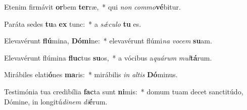\item Etenim firmávit \textbf{or}bem \textbf{ter}ræ,~* qui \textit{non} \textit{com}\textit{mo}\textbf{vé}bitur.
\item Paráta sedes \textbf{tu}a \textbf{ex} tunc:~* a \textit{sǽ}\textit{cu}\textit{lo} \textbf{tu} es.
\item Elevavérunt \textbf{flú}mina, \textbf{Dó}\textbf{mi}ne:~* elevavérunt flúmi\textit{na} \textit{vo}\textit{cem} \textbf{su}am.
\item Elevavérunt flúmina \textbf{fluc}tus \textbf{su}os,~* a vócibus a\textit{quá}\textit{rum} \textit{mul}\textbf{tá}rum.
\item Mirábiles elati\textbf{ó}nes \textbf{ma}ris:~* mirábilis \textit{in} \textit{al}\textit{tis} \textbf{Dó}minus.
\item Testimónia tua credibília \textbf{fac}ta sunt \textbf{ni}mis:~* domum tuam decet sanctitúdo, Dómine, in longitú\textit{di}\textit{nem} \textit{di}\textbf{é}rum.
